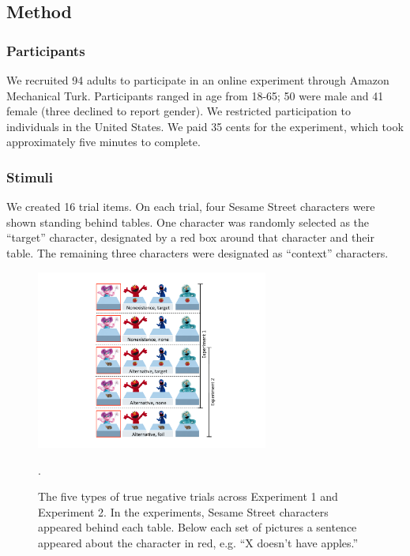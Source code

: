\documentclass[10pt,letterpaper]{article}
\begin{document}
\subsection{Method}

\subsubsection{Participants}

We recruited 94 adults to participate in an online experiment through Amazon Mechanical Turk.  Participants ranged in age from 18-65; 50 were male and 41 female (three declined to report gender).  We restricted participation to individuals in the United States. We paid 35 cents for the experiment, which took approximately five minutes to complete.  

\subsubsection{Stimuli}

We created 16 trial items. On each trial, four Sesame Street characters were shown standing behind tables.  One character was randomly selected as the ``target'' character, designated by a red box around that character and their table. The remaining three characters were designated as ``context'' characters.


\begin{figure}[t]
\begin{center} 
\includegraphics[width=3in]{figures/trialtypes.pdf}
\caption{\label{fig:trial} The five types of true negative trials across Experiment 1 and Experiment 2.  In the experiments, Sesame Street characters appeared behind each table.  Below each set of pictures a sentence appeared about the character in red, e.g. ``X doesn't have apples.''}.  
\end{center} 
\end{figure}
\end{document}

